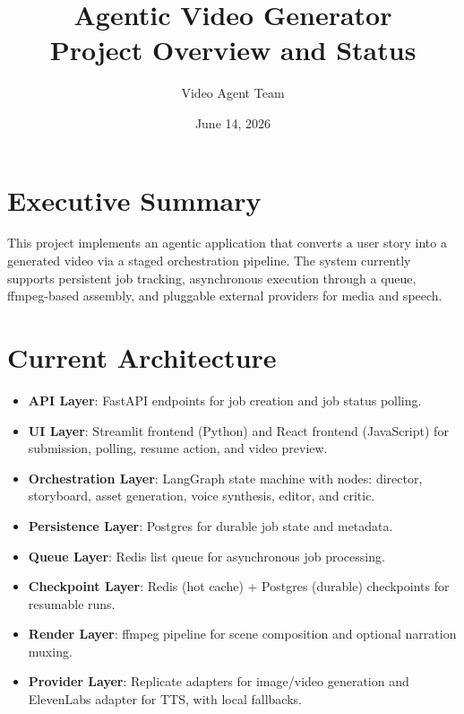 \documentclass[11pt]{article}
\title{Agentic Video Generator\\Project Overview and Status}
\author{Video Agent Team}
\date{June 14, 2026}
\begin{document}
\maketitle

\section*{Executive Summary}
This project implements an agentic application that converts a user story into a generated video via a staged orchestration pipeline. The system currently supports persistent job tracking, asynchronous execution through a queue, ffmpeg-based assembly, and pluggable external providers for media and speech.

\section*{Current Architecture}
\begin{itemize}[leftmargin=*]
  \item \textbf{API Layer}: FastAPI endpoints for job creation and job status polling.
  \item \textbf{UI Layer}: Streamlit frontend (Python) and React frontend (JavaScript) for submission, polling, resume action, and video preview.
  \item \textbf{Orchestration Layer}: LangGraph state machine with nodes: director, storyboard, asset generation, voice synthesis, editor, and critic.
  \item \textbf{Persistence Layer}: Postgres for durable job state and metadata.
  \item \textbf{Queue Layer}: Redis list queue for asynchronous job processing.
  \item \textbf{Checkpoint Layer}: Redis (hot cache) + Postgres (durable) checkpoints for resumable runs.
  \item \textbf{Render Layer}: ffmpeg pipeline for scene composition and optional narration muxing.
  \item \textbf{Provider Layer}: Replicate adapters for image/video generation and ElevenLabs adapter for TTS, with local fallbacks.
\end{itemize}
\end{document}
